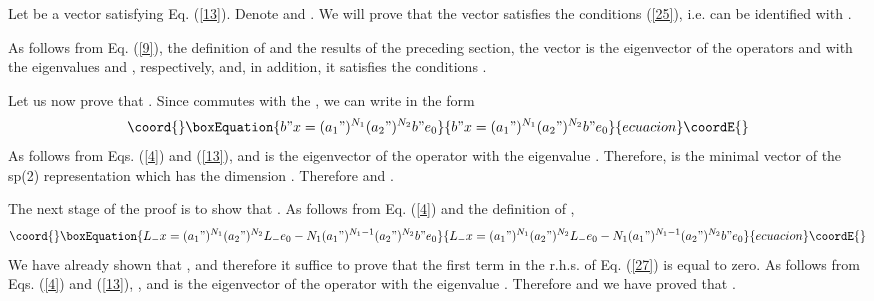 \documentclass[a4paper,12pt]{article}%
\begin{document}
Let \coordHE{} be a vector satisfying Eq. (\ref{13}). Denote 
\coordHE{} and \coordHE{}. We will prove that the vector 
\coordHE{} satisfies the conditions
(\ref{25}), i.e. \coordHE{} can be identified with \coordHE{}. 

As follows from Eq. (\ref{9}), the definition of \coordHE{}
and the results of the preceding section, the vector \coordHE{}
is the eigenvector of the operators \coordHE{} and \coordHE{} with
the eigenvalues \coordHE{} and \coordHE{}, respectively, and, in
addition, it satisfies the conditions \coordHE{}.

Let us now prove that \coordHE{}. Since \coordHE{} commutes with the
\coordHE{}, we can write \coordHE{} in the form
\begin{equation}\coord{}\boxEquation{
b"x = (a_1")^{N_1}(a_2")^{N_2}b"e_0
\label{26}
}{
b"x = (a_1")^{N_1}(a_2")^{N_2}b"e_0
}{ecuacion}\coordE{}\end{equation}
As follows from Eqs. (\ref{4}) and (\ref{13}), 
\coordHE{} and \coordHE{} is the eigenvector
of the operator \coordHE{} with the eigenvalue \coordHE{}.
Therefore, \coordHE{} is the minimal vector of the sp(2)
representation which has the dimension \coordHE{}.
Therefore \coordHE{} and \coordHE{}.

The next stage of the proof is to show that \coordHE{}.
As follows from Eq. (\ref{4}) and the definition of
\coordHE{},
\begin{equation}\coord{}\boxEquation{
L_-x = (a_1")^{N_1}(a_2")^{N_2}L_-e_0-
N_1(a_1")^{N_1-1}(a_2")^{N_2}b"e_0
\label{27}
}{
L_-x = (a_1")^{N_1}(a_2")^{N_2}L_-e_0-
N_1(a_1")^{N_1-1}(a_2")^{N_2}b"e_0
}{ecuacion}\coordE{}\end{equation}
We have already shown that \coordHE{},
and therefore it suffice to prove that the first term
in the r.h.s. of Eq. (\ref{27}) is equal to zero. As follows
from Eqs. (\ref{4}) and (\ref{13}), \coordHE{},
and \coordHE{} is the eigenvector of the operator \coordHE{} with the
eigenvalue \coordHE{}. Therefore \coordHE{} and we
have proved that \coordHE{}.
\end{document}
